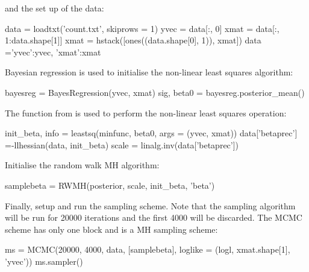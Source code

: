 \documentclass[article]{jss}
\begin{document}
and the set up of the data:
\begin{Code}
data = loadtxt('count.txt', skiprows = 1)
yvec = data[:, 0]
xmat = data[:, 1:data.shape[1]]
xmat = hstack([ones((data.shape[0], 1)), xmat])
data ={'yvec':yvec, 'xmat':xmat} 
\end{Code}

Bayesian regression is used to initialise the non-linear least squares
algorithm:
\begin{Code}
bayesreg = BayesRegression(yvec, xmat)
sig, beta0 = bayesreg.posterior_mean()
\end{Code}

The function  from  is used to perform the
non-linear least squares operation:

\begin{Code}
init_beta, info = leastsq(minfunc, beta0, args = (yvec, xmat))
data['betaprec'] =-llhessian(data, init_beta)
scale = linalg.inv(data['betaprec'])
\end{Code}

Initialise the random walk MH algorithm:
\begin{Code}
samplebeta = RWMH(posterior, scale, init_beta, 'beta')
\end{Code}

Finally, setup and run the sampling scheme.  Note that the sampling
algorithm will be run for 20000 iterations and the first 4000 will be
discarded. The MCMC scheme has only one block and is a MH sampling
scheme:

\begin{Code}
ms = MCMC(20000, 4000, data, [samplebeta], loglike = (logl, xmat.shape[1], 'yvec'))
ms.sampler()
\end{Code}






\end{document}
